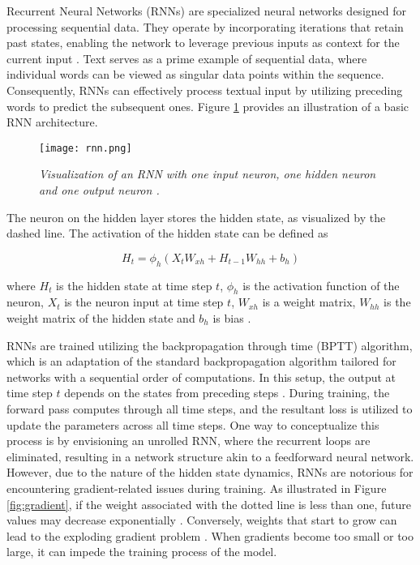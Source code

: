 Recurrent Neural Networks (RNNs) are specialized neural networks designed for processing sequential data. They operate by incorporating iterations that retain past states, enabling the network to leverage previous inputs as context for the current input \cite{schmidt2019recurrent}. Text serves as a prime example of sequential data, where individual words can be viewed as singular data points within the sequence. Consequently, RNNs can effectively process textual input by utilizing preceding words to predict the subsequent ones. Figure \ref{fig:rnn} provides an illustration of a basic RNN architecture.


\begin{figure}[H]
    \centering
    \texttt{[image: rnn.png]}
    \caption[Visualization of an RNN \cite{lipton2015critical}.]{
        \it{Visualization of an RNN with one input neuron, one hidden neuron and
            one output neuron \cite{lipton2015critical}.}
    }
    \label{fig:rnn}
\end{figure}

The neuron on the hidden layer stores the hidden state, as visualized by the dashed
line. The activation of the hidden state can be defined as

\begin{equation}
    H_t = \phi_h(X_tW_{xh} + H_{t-1}W_{hh} + b_h)
\end{equation}

where \(H_t\) is the hidden state at time step \(t\), \(\phi_h\) is the activation function of the neuron, \(X_t\) is the neuron input at time step \(t\), \(W_{xh}\) is a weight matrix, \(W_{hh}\) is the weight matrix of the hidden state and \(b_h\) is bias \cite{schmidt2019recurrent}.

RNNs are trained utilizing the backpropagation through time (BPTT) algorithm, which is an adaptation of the standard backpropagation algorithm tailored for networks with a sequential order of computations. In this setup, the output at time step \(t\) depends on the states from preceding steps \cite{58337}. During training, the forward pass computes through all time steps, and the resultant loss is utilized to update the parameters across all time steps. One way to conceptualize this process is by envisioning an unrolled RNN, where the recurrent loops are eliminated, resulting in a network structure akin to a feedforward neural network. However, due to the nature of the hidden state dynamics, RNNs are notorious for encountering gradient-related issues during training. As illustrated in Figure \ref{fig:gradient}, if the weight associated with the dotted line is less than one, future values may decrease exponentially \cite{lipton2015critical}. Conversely, weights that start to grow can lead to the exploding gradient problem \cite{schmidt2019recurrent}. When gradients become too small or too large, it can impede the training process of the model.


